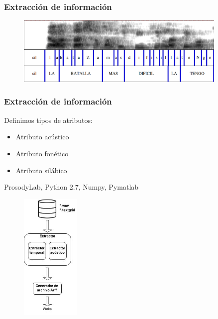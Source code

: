 \documentclass[mathserif]{beamer}%
\begin{document}
\begin{frame}
	\frametitle{Extracción de información}
	
	\begin{figure}[h!]
		\centerline{\includegraphics[width=0.9\textwidth]{espectrograma_u3_t33_a1} }
	\end{figure}
\end{frame}

\begin{frame}
	\frametitle{Extracción de información}
	\begin{multicols}{2}
		Definimos tipos de atributos:
		\begin{itemize}
			\item Atributo acústico
			\pause
			\item Atributo fonético
			\pause
			\item Atributo silábico
			\pause
		\end{itemize}
		{\tiny ProsodyLab, Python 2.7, Numpy, Pymatlab}
		
		\begin{figure}[rh!]
			\centerline{\includegraphics[width=0.25\textwidth]{diagrama_workflow} }
		\end{figure}
	\end{multicols}
	
\end{frame}

\end{document}
